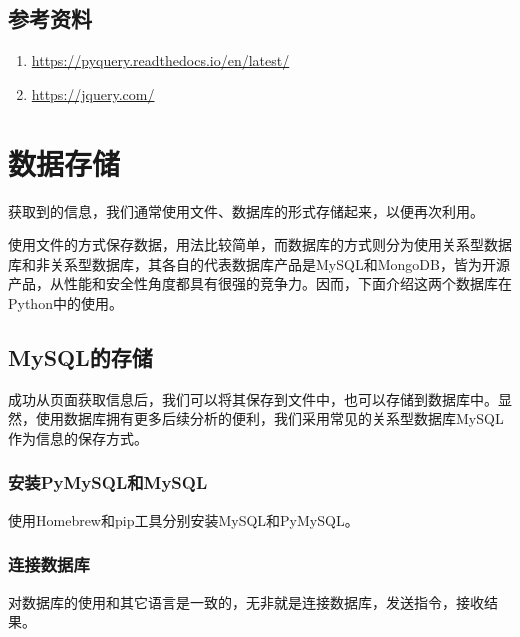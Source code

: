 \documentclass[]{ctexbook}
\providecommand{\tightlist}{%
  \setlength{\itemsep}{0pt}\setlength{\parskip}{0pt}}
\begin{document}
\hypertarget{ux53c2ux8003ux8d44ux6599-3}{%
\section{参考资料}\label{ux53c2ux8003ux8d44ux6599-3}}

\begin{enumerate}
\def\labelenumi{\arabic{enumi}.}
\tightlist
\item
  \url{https://pyquery.readthedocs.io/en/latest/}
\item
  \url{https://jquery.com/}
\end{enumerate}

\hypertarget{databases}{%
\chapter{数据存储}\label{databases}}

获取到的信息，我们通常使用文件、数据库的形式存储起来，以便再次利用。

使用文件的方式保存数据，用法比较简单，而数据库的方式则分为使用关系型数据库和非关系型数据库，其各自的代表数据库产品是MySQL和MongoDB，皆为开源产品，从性能和安全性角度都具有很强的竞争力。因而，下面介绍这两个数据库在Python中的使用。

\hypertarget{mysqlux7684ux5b58ux50a8}{%
\section{MySQL的存储}\label{mysqlux7684ux5b58ux50a8}}

成功从页面获取信息后，我们可以将其保存到文件中，也可以存储到数据库中。显然，使用数据库拥有更多后续分析的便利，我们采用常见的关系型数据库MySQL作为信息的保存方式。

\hypertarget{ux5b89ux88c5pymysqlux548cmysql}{%
\subsection{安装PyMySQL和MySQL}\label{ux5b89ux88c5pymysqlux548cmysql}}

使用Homebrew和pip工具分别安装MySQL和PyMySQL。

\hypertarget{ux8fdeux63a5ux6570ux636eux5e93}{%
\subsection{连接数据库}\label{ux8fdeux63a5ux6570ux636eux5e93}}

对数据库的使用和其它语言是一致的，无非就是连接数据库，发送指令，接收结果。
\end{document}
